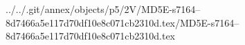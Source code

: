 ../../.git/annex/objects/p5/2V/MD5E-s7164--8d7466a5e117d70df10e8c071cb2310d.tex/MD5E-s7164--8d7466a5e117d70df10e8c071cb2310d.tex